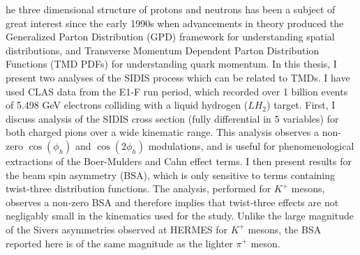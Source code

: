 he three dimensional structure of protons and neutrons has been a subject of great interest since the early 1990s when advancements in theory produced the Generalized Parton Distribution (GPD) framework for understanding spatial distributions, and Transverse Momentum Dependent Parton Distribution Functions (TMD PDFs) for understanding quark momentum.  In this thesis, I present two analyses of the SIDIS process which can be related to TMDs.  I have used CLAS data from the E1-F run period, which recorded over 1 billion events of 5.498 GeV electrons colliding with a liquid hydrogen ($LH_2$) target.  First, I discuss analysis of the SIDIS cross section (fully differential in 5 variables) for both charged pions over a wide kinematic range.  This analysis observes a non-zero $\cos(\phi_h)$ and $\cos(2\phi_h)$ modulations, and is useful for phenomenological extractions of the Boer-Mulders and Cahn effect terms.  I then present results for the beam spin asymmetry (BSA), which is only sensitive to terms containing twist-three distribution functions.  The analysis, performed for $K^+$ mesons, observes a non-zero BSA and therefore implies that twist-three effects are not negligably small in the kinematics used for the study.  Unlike the large magnitude of the Sivers asymmetries observed at HERMES for $K^+$ mesons, the BSA reported here is of the same magnitude as the lighter $\pi^+$ meson. 
